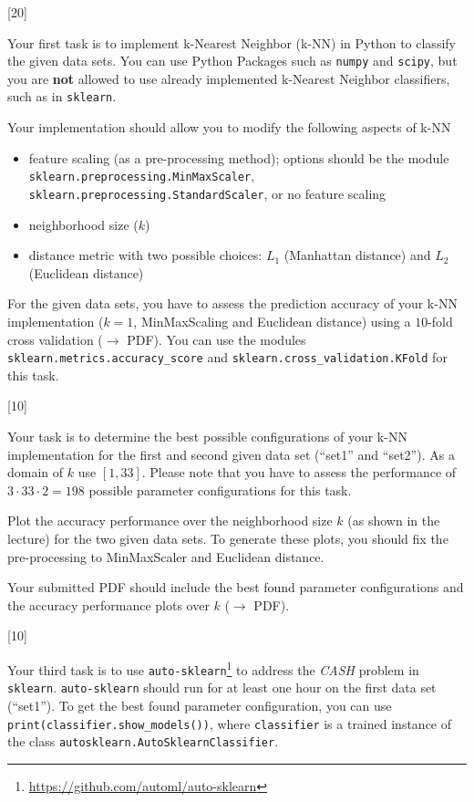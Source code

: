 \documentclass{exam}
\begin{document}
\begin{questions}


[20]

Your first task is to implement k-Nearest Neighbor (k-NN) in Python to classify the given data sets. 
You can use Python Packages such as \texttt{numpy} and \texttt{scipy},
but you are \textbf{not} allowed to use already implemented k-Nearest Neighbor classifiers, such as in \texttt{sklearn}.

Your implementation should allow you to modify the following aspects of k-NN

\begin{itemize}
  \item feature scaling (as a pre-processing method); options should be the module\\ \texttt{sklearn.preprocessing.MinMaxScaler}, \texttt{sklearn.preprocessing.StandardScaler}, or no feature scaling
  \item neighborhood size ($k$)
  \item distance metric with two possible choices: $L_1$ (Manhattan distance) and $L_2$ (Euclidean distance)
\end{itemize}

For the given data sets, you have to assess the prediction accuracy of your k-NN implementation ($k =1$, MinMaxScaling and Euclidean distance) using a $10$-fold cross validation ($\to$ PDF). You can use the modules \texttt{sklearn.metrics.accuracy\_score} and \texttt{sklearn.cross\_validation.KFold} for this task.
	
[10]

Your task is to determine the best possible configurations of your k-NN implementation for the first and second given data set (``set1'' and ``set2'').
As a domain of $k$ use $[1,33]$. Please note that you have to assess the performance of $3 \cdot 33 \cdot 2 = 198$ possible parameter configurations for this task. 

Plot the accuracy performance over the neighborhood size $k$ (as shown in the lecture) for the two given data sets. To generate these plots, you should fix the pre-processing to MinMaxScaler and Euclidean distance. 

Your submitted PDF should include the best found parameter configurations and the accuracy performance plots over $k$ ($\to$ PDF).

[10]

Your third task is to use \texttt{auto-sklearn}\footnote{\url{https://github.com/automl/auto-sklearn}} to address the \emph{CASH} problem in \texttt{sklearn}. \texttt{auto-sklearn} should run for at least one hour on the first data set (``set1''). 
To get the best found parameter configuration, you can use \texttt{print(classifier.show\_models())}, where \texttt{classifier} is a trained instance of the class \texttt{autosklearn.AutoSklearnClassifier}.


\end{questions}
\end{document}
